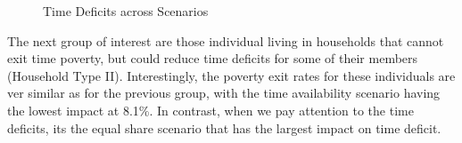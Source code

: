 \documentclass[
  11pt,
]{article}
\begin{document}
\begin{figure}[H]


\caption{\label{fig-deficit}Time Deficits across Scenarios}

\end{figure}%

The next group of interest are those individual living in households
that cannot exit time poverty, but could reduce time deficits for some
of their members (Household Type II). Interestingly, the poverty exit
rates for these individuals are ver similar as for the previous group,
with the time availability scenario having the lowest impact at 8.1\%.
In contrast, when we pay attention to the time deficits, its the equal
share scenario that has the largest impact on time deficit.
\end{document}
